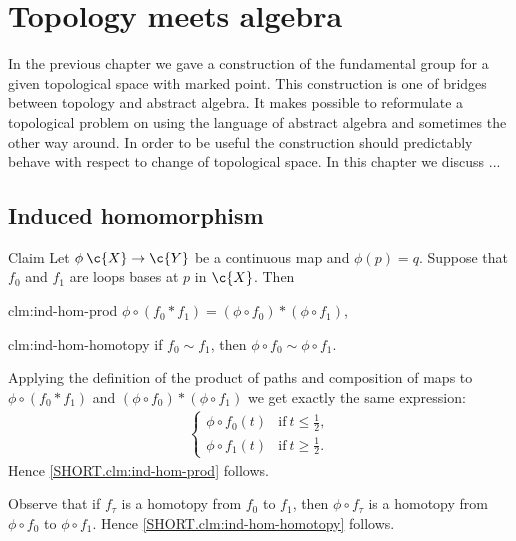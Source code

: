 \chapter{Topology meets algebra}

In the previous chapter we gave a construction of the fundamental group for a given topological space with marked point.
This construction is one of bridges between topology and abstract algebra.
It makes possible to reformulate a topological problem on using the language of abstract algebra and sometimes the other way around.
In order to be useful the construction should predictably behave with respect to change of topological space.
In this chapter we discuss ...

\section{Induced homomorphism}

\begin{thm}{Claim}\label{clm:ind-hom}
Let $\phi\:\c{X}\to \c{Y}$ be a continuous map and $\phi(p)=q$.
Suppose that $f_0$ and $f_1$ are loops bases at $p$ in $\c{X}$.
Then

\begin{subthm}{clm:ind-hom-prod}
$\phi\circ(f_0*f_1)=(\phi\circ f_0)*(\phi\circ f_1)$,
\end{subthm}

\begin{subthm}{clm:ind-hom-homotopy}
if $f_0\sim f_1$, then $\phi\circ f_0\sim\phi\circ f_1$.
\end{subthm}

\end{thm}

Applying the definition of the product of paths and composition of maps to $\phi\circ(f_0*f_1)$ and $(\phi\circ f_0)*(\phi\circ f_1)$ we get exactly the same expression:
\begin{align*}
\begin{cases}
\phi\circ f_0(t)&\text{if}\ t\le \tfrac12,
\\
\phi\circ f_1(t)&\text{if}\ t\ge \tfrac12.
\end{cases}
\end{align*}
Hence \ref{SHORT.clm:ind-hom-prod} follows.

Observe that if $f_\tau$ is a homotopy from $f_0$ to $f_1$, then $\phi\circ f_\tau$ is a homotopy from $\phi\circ f_0$ to $\phi\circ f_1$.
Hence \ref{SHORT.clm:ind-hom-homotopy} follows.
\qeds

